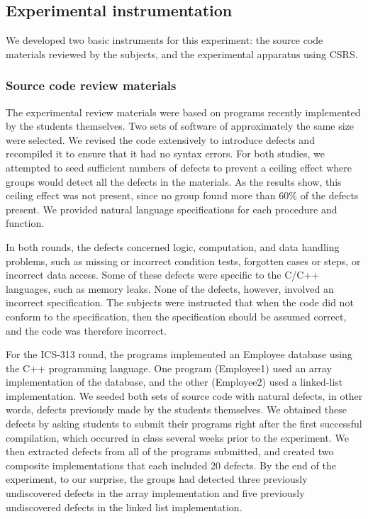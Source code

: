 \subsection{Experimental instrumentation}

We developed two basic instruments for this experiment: the source
code materials reviewed by the subjects, and the experimental apparatus
using CSRS. 

\subsubsection{Source code review materials}

The experimental review materials were based on programs recently
implemented by the students themselves.  Two sets of software of
approximately the same size were selected.  We revised the code extensively
to introduce defects and recompiled it to ensure that it had no syntax
errors.  For both studies, we attempted to seed sufficient numbers of
defects to prevent a ceiling effect where groups would detect all the
defects in the materials.  As the results show, this ceiling effect was not
present, since no group found more than 60\% of the defects present. We
provided natural language specifications for each procedure and function.

In both rounds, the defects concerned logic, computation, and data handling
problems, such as missing or incorrect condition tests, forgotten cases or
steps, or incorrect data access. Some of these defects were specific to
the C/C++ languages, such as memory leaks.  None of the defects, however,
involved an incorrect specification. The subjects were instructed that when
the code did not conform to the specification, then the specification
should be assumed correct, and the code was therefore incorrect.

For the ICS-313 round, the programs implemented an Employee database using
the C++ programming language. One program (Employee1) used an array
implementation of the database, and the other (Employee2) used a
linked-list implementation.  We seeded both sets of source code with
natural defects, in other words, defects previously made by the students
themselves.  We obtained these defects by asking students to submit their
programs right after the first successful compilation, which occurred in
class several weeks prior to the experiment.  We then extracted defects
from all of the programs submitted, and created two composite
implementations that each included 20 defects. By the end of the
experiment, to our surprise, the groups had detected three previously
undiscovered defects in the array implementation and five previously
undiscovered defects in the linked list implementation.

